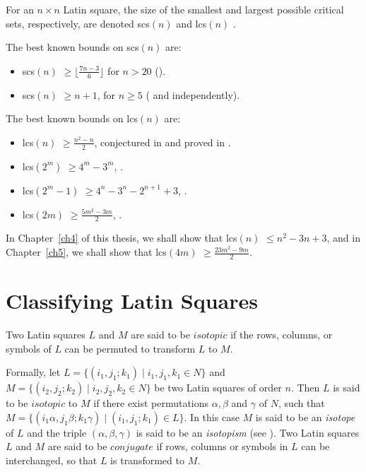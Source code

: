 \documentclass[12pt]{report}
\def\lcs#1{{\rm lcs}$(#1)$}
\def\scs#1{{\rm scs}$(#1)$}
\begin{document}
For an $n \times n$ Latin
square, the size of the smallest and largest possible critical sets,
respectively, are denoted \scs{n} and \lcs{n} \cite{Nel1}.

The best known bounds on \scs{n} are:
\begin{itemize}
\item \scs{n} $\geq \lfloor \displaystyle\frac{7n-3}{6} \rfloor$
for $n > 20$ (\cite{MR1468170}).
\item \scs{n} $\geq n + 1$, for $n \geq 5$ (\cite{MR96h:05030} and  \cite{MR95h:05032} independently).
\end{itemize}

The best known bounds on \lcs{n} are:
\begin{itemize}
\item \lcs{n} $\geq \displaystyle\frac{n^2-n}{2}$, conjectured in \cite{nel2} and proved in \cite{MR97g:05032}.
\item \lcs{2^m} $\geq 4^m - 3^m$,  \cite{MR84g:05036}.
\item \lcs{2^m - 1} $\geq 4^n - 3^n - 2^{n+1} + 3$, \cite{MR96h:05030}.
\item \lcs{2m} $\geq \displaystyle\frac{5m^2-3m}{2}$, \cite{MR99a:05018}.
\end{itemize}
In Chapter~\ref{ch4} of this thesis, we shall show that \lcs{n} $\leq n^2 -
3n + 3$, and in Chapter~\ref{ch5}, we shall show that \lcs{4m}
$\geq \displaystyle{\frac{23m^2-9m}{2}}$.

\section{Classifying Latin Squares}\label{sec27}
Two Latin squares $L$ and $M$ are said to be $isotopic$ if the rows, columns,
or symbols of $L$ can be permuted to transform $L$ to $M$.

Formally, let $L = \{ (i_1, j_1; k_1) \mid i_1, j_1, k_1 \in N \}$ and 
$M = \{ (i_2, j_2; k_2) \mid i_2, j_2, k_2 \in N \}$ be two Latin squares
of order $n$.  Then $L$ is said to be $isotopic$ to $M$ if there
exist permutations $\alpha, \beta$ and $\gamma$ of $N$, such that 
$M = \{ (i_1 \alpha, j_1 \beta; k_1 \gamma) \mid (i_1, j_1; k_1) \in L \}$.
In this case $M$ is said to be an {\it isotope} of $L$ and the triple
$(\alpha, \beta, \gamma)$ is said to be an {\it isotopism} (see \cite{howse:thesis}).
Two Latin squares $L$ and $M$ are said to be $conjugate$ if rows, columns or symbols
in $L$ can be interchanged, so that $L$ is transformed to $M$.
\end{document}
